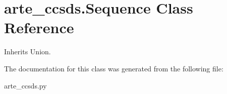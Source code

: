 \section{arte\+\_\+ccsds.\+Sequence Class Reference}
\label{classarte__ccsds_1_1_sequence}


Inherits Union.



The documentation for this class was generated from the following file\+:\begin{DoxyCompactItemize}
\item 
arte\+\_\+ccsds.\+py\end{DoxyCompactItemize}
